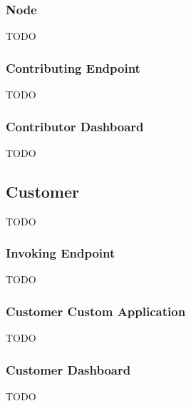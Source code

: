 \subsubsection{Node}
TODO

\subsubsection{Contributing Endpoint}
TODO

\subsubsection{Contributor Dashboard}
TODO

\subsection{Customer}
TODO

\subsubsection{Invoking Endpoint}
TODO

\subsubsection{Customer Custom Application}
TODO

\subsubsection{Customer Dashboard}
TODO
